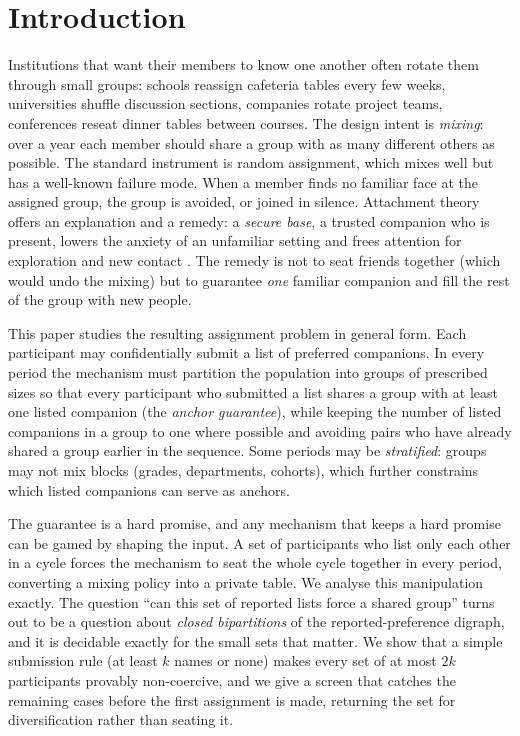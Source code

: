 \documentclass[11pt,a4paper]{article}
\theoremstyle{plain}
\theoremstyle{definition}
\theoremstyle{remark}
\begin{document}
\section{Introduction}
\label{sec:intro}

Institutions that want their members to know one another often rotate them through small groups: schools reassign cafeteria tables every few weeks, universities shuffle discussion sections, companies rotate project teams, conferences reseat dinner tables between courses. The design intent is \emph{mixing}: over a year each member should share a group with as many different others as possible. The standard instrument is random assignment, which mixes well but has a well-known failure mode. When a member finds no familiar face at the assigned group, the group is avoided, or joined in silence. Attachment theory offers an explanation and a remedy: a \emph{secure base}, a trusted companion who is present, lowers the anxiety of an unfamiliar setting and frees attention for exploration and new contact \citep{bowlby1988}. The remedy is not to seat friends together (which would undo the mixing) but to guarantee \emph{one} familiar companion and fill the rest of the group with new people.

This paper studies the resulting assignment problem in general form. Each participant may confidentially submit a list of preferred companions. In every period the mechanism must partition the population into groups of prescribed sizes so that every participant who submitted a list shares a group with at least one listed companion (the \emph{anchor guarantee}), while keeping the number of listed companions in a group to one where possible and avoiding pairs who have already shared a group earlier in the sequence. Some periods may be \emph{stratified}: groups may not mix blocks (grades, departments, cohorts), which further constrains which listed companions can serve as anchors.

The guarantee is a hard promise, and any mechanism that keeps a hard promise can be gamed by shaping the input. A set of participants who list only each other in a cycle forces the mechanism to seat the whole cycle together in every period, converting a mixing policy into a private table. We analyse this manipulation exactly. The question ``can this set of reported lists force a shared group'' turns out to be a question about \emph{closed bipartitions} of the reported-preference digraph, and it is decidable exactly for the small sets that matter. We show that a simple submission rule (at least $k$ names or none) makes every set of at most $2k$ participants provably non-coercive, and we give a screen that catches the remaining cases before the first assignment is made, returning the set for diversification rather than seating it.
\end{document}
